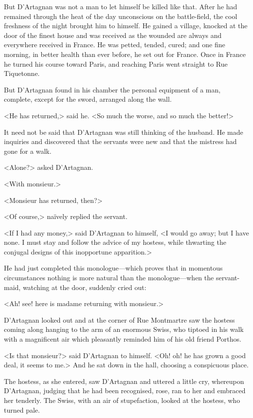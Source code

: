 But D'Artagnan was not a man to let himself be killed like that. After he had remained through the heat of the day unconscious on the battle-field, the cool freshness of the night brought him to himself. He gained a village, knocked at the door of the finest house and was received as the wounded are always and everywhere received in France. He was petted, tended, cured; and one fine morning, in better health than ever before, he set out for France. Once in France he turned his course toward Paris, and reaching Paris went straight to Rue Tiquetonne.

But D'Artagnan found in his chamber the personal equipment of a man, complete, except for the sword, arranged along the wall.

<He has returned,> said he. <So much the worse, and so much the better!>

It need not be said that D'Artagnan was still thinking of the husband. He made inquiries and discovered that the servants were new and that the mistress had gone for a walk.

<Alone?> asked D'Artagnan.

<With monsieur.>

<Monsieur has returned, then?>

<Of course,> naïvely replied the servant.

<If I had any money,> said D'Artagnan to himself, <I would go away; but I have none. I must stay and follow the advice of my hostess, while thwarting the conjugal designs of this inopportune apparition.>

He had just completed this monologue—which proves that in momentous circumstances nothing is more natural than the monologue—when the servant-maid, watching at the door, suddenly cried out:

<Ah! see! here is madame returning with monsieur.>

D'Artagnan looked out and at the corner of Rue Montmartre saw the hostess coming along hanging to the arm of an enormous Swiss, who tiptoed in his walk with a magnificent air which pleasantly reminded him of his old friend Porthos.

<Is that monsieur?> said D'Artagnan to himself. <Oh! oh! he has grown a good deal, it seems to me.> And he sat down in the hall, choosing a conspicuous place.

The hostess, as she entered, saw D'Artagnan and uttered a little cry, whereupon D'Artagnan, judging that he had been recognised, rose, ran to her and embraced her tenderly. The Swiss, with an air of stupefaction, looked at the hostess, who turned pale.

